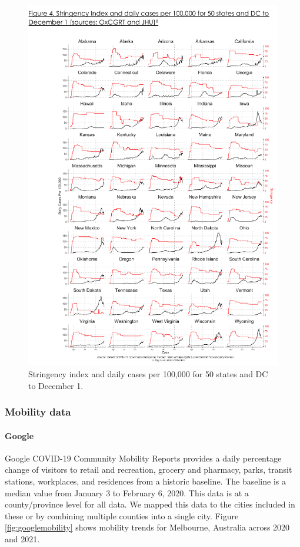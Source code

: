 \documentclass[final,3p,times,authoryear]{elsarticle}
\begin{document}
\begin{figure}
\centering
\includegraphics[width=.99\linewidth]{images/Hallas2020-stateStr.png}
\caption{Stringency index and daily cases per 100,000 for 50 states and DC to December 1\citep{Hallas2020}.}
 \label{fig:statestr}
\end{figure}


\subsubsection{Mobility data}
\paragraph{Google}

Google COVID-19 Community Mobility Reports \citep{Google2020} provides a  daily percentage change of visitors to retail and recreation, grocery and pharmacy, parks, transit stations, workplaces, and residences from a historic baseline. The baseline is a median value from January 3 to February 6, 2020. This data is at a county/province level for all data. We mapped this data to the cities included in these or by combining multiple counties into a single city. Figure \ref{fig:googlemobility} shows mobility trends for Melbourne, Australia across 2020 and 2021.
\end{document}
